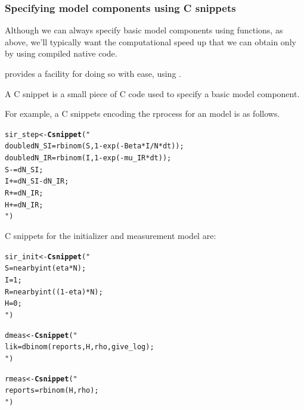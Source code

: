 \documentclass{beamer}\usepackage[]{graphicx}\usepackage[]{color}
\makeatletter
\newcommand{\hlstr}[1]{\textcolor[rgb]{0.192,0.494,0.8}{#1}}%
\newcommand{\hlstd}[1]{\textcolor[rgb]{0.345,0.345,0.345}{#1}}%
\newcommand{\hlkwb}[1]{\textcolor[rgb]{0.69,0.353,0.396}{#1}}%
\newcommand{\hlkwd}[1]{\textcolor[rgb]{0.737,0.353,0.396}{\textbf{#1}}}%
\newenvironment{kframe}{%
 \def\at@end@of@kframe{}%
 \ifinner\ifhmode%
  \def\at@end@of@kframe{\end{minipage}}%
  \begin{minipage}{\columnwidth}%
 \fi\fi%
 \def\FrameCommand##1{\hskip\@totalleftmargin \hskip-\fboxsep
 \colorbox{shadecolor}{##1}\hskip-\fboxsep
     \hskip-\linewidth \hskip-\@totalleftmargin \hskip\columnwidth}%
 \MakeFramed {\advance\hsize-\width
   \@totalleftmargin\z@ \linewidth\hsize
   \@setminipage}}%
 {\par\unskip\endMakeFramed%
 \at@end@of@kframe}
\newenvironment{knitrout}{}{} %
\makeatother
\begin{document}
\begin{frame}[fragile] 
\frametitle{Specifying model components using C snippets}

\bi

\item Although we can always specify basic model components using {\Rlanguage} functions, as above, we'll typically want the computational speed up that we can obtain only by using compiled native code.

\item {} provides a facility for doing so with ease, using .

\item A C snippet is a small piece of C code used to specify a basic model component.

\item For example, a C snippets encoding the rprocess for an  model is as follows.

\ei

\begin{knitrout}\small
{}\color{fgcolor}\begin{kframe}
\begin{alltt}
\hlstd{sir_step} \hlkwb{<-} \hlkwd{Csnippet}\hlstd{(}\hlstr{"
  double dN_SI = rbinom(S,1-exp(-Beta*I/N*dt));
  double dN_IR = rbinom(I,1-exp(-mu_IR*dt));
  S -= dN_SI;
  I += dN_SI - dN_IR;
  R += dN_IR;
  H += dN_IR;
"}\hlstd{)}
\end{alltt}
\end{kframe}
\end{knitrout}

\end{frame}

\begin{frame}[fragile]
\bi
\item
C snippets for the initializer and measurement model are:
\ei
\begin{knitrout}\small
{}\color{fgcolor}\begin{kframe}
\begin{alltt}
\hlstd{sir_init} \hlkwb{<-} \hlkwd{Csnippet}\hlstd{(}\hlstr{"
  S = nearbyint(eta*N);
  I = 1;
  R = nearbyint((1-eta)*N);
  H = 0;
"}\hlstd{)}

\hlstd{dmeas} \hlkwb{<-} \hlkwd{Csnippet}\hlstd{(}\hlstr{"
  lik = dbinom(reports,H,rho,give_log);
"}\hlstd{)}

\hlstd{rmeas} \hlkwb{<-} \hlkwd{Csnippet}\hlstd{(}\hlstr{"
  reports = rbinom(H,rho);
"}\hlstd{)}
\end{alltt}
\end{kframe}
\end{knitrout}


\end{frame}
\end{document}
